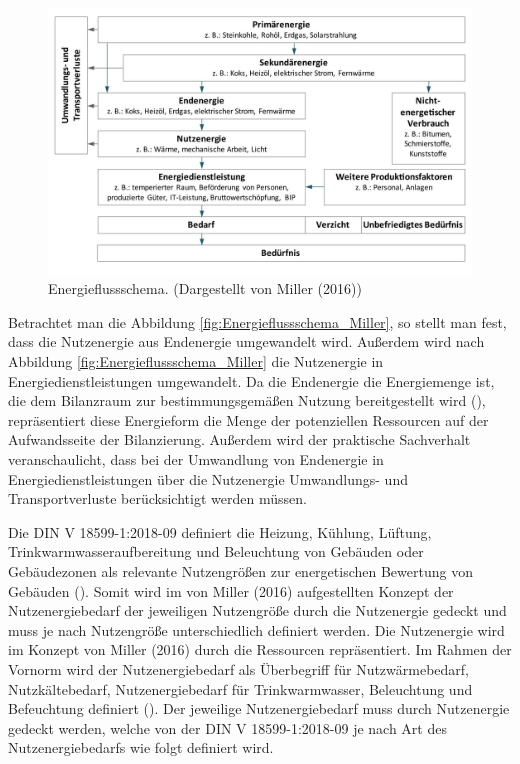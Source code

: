 \begin{figure}[H]
    \centering
    \includegraphics[width=1\textwidth]{../../Ressourcen/Abbildungen/Energiefluss_Miller.jpg}
    \caption{Energieflussschema. (Dargestellt von Miller (2016))}
    \label{fig:Energieflussschema_Miller}
\end{figure}

Betrachtet man die Abbildung \eqref{fig:Energieflussschema_Miller}, so stellt man fest, dass die Nutzenergie aus Endenergie umgewandelt wird.
Außerdem wird nach Abbildung \eqref{fig:Energieflussschema_Miller} die Nutzenergie in Energiedienstleistungen umgewandelt.
Da die Endenergie die Energiemenge ist, die dem Bilanzraum zur bestimmungsgemäßen Nutzung bereitgestellt wird (\cite[Kapitel 3.1.2]{DIN18599.2018}), 
repräsentiert diese Energieform die Menge der potenziellen Ressourcen auf der Aufwandsseite der Bilanzierung.
Außerdem wird der praktische Sachverhalt veranschaulicht, dass bei der Umwandlung von Endenergie in Energiedienstleistungen über die Nutzenergie 
Umwandlungs- und Transportverluste berücksichtigt werden müssen.

Die DIN V 18599-1:2018-09 definiert die Heizung, Kühlung, Lüftung, Trinkwarmwasseraufbereitung und Beleuchtung von Gebäuden oder Gebäudezonen 
als relevante Nutzengrößen zur energetischen Bewertung von Gebäuden (\cite{DIN18599.2018}).
Somit wird im von Miller (2016) aufgestellten Konzept der Nutzenergiebedarf der jeweiligen Nutzengröße durch die Nutzenergie gedeckt und muss 
je nach Nutzengröße unterschiedlich definiert werden. Die Nutzenergie wird im Konzept von Miller (2016) durch die Ressourcen repräsentiert.
Im Rahmen der Vornorm wird der Nutzenergiebedarf als Überbegriff für Nutzwärmebedarf, Nutzkältebedarf, Nutzenergiebedarf für Trinkwarmwasser, 
Beleuchtung und Befeuchtung definiert (\cite[Kapitel 3.1.3]{DIN18599.2018}).
Der jeweilige Nutzenergiebedarf muss durch Nutzenergie gedeckt werden, welche von der DIN V 18599-1:2018-09 je nach Art des Nutzenergiebedarfs 
wie folgt definiert wird.

